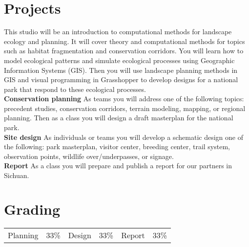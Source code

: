 \documentclass[11pt,article,oneside]{memoir}
\begin{document}
\clearpage

\section{Projects}
This studio will be an introduction to 
computational methods for landscape ecology and planning. 
It will cover theory and computational methods for topics 
such as habitat fragmentation and conservation corridors. 
You will learn how to model ecological patterns 
and simulate ecological processes 
using Geographic Information Systems (GIS). 
Then you will use landscape planning methods in GIS 
and visual programming in Grasshopper 
to develop designs for a national park 
that respond to these ecological processes. \\

\noindent \textbf{Conservation planning}
As teams you will address one of the following topics:
precedent studies, conservation corridors, terrain modeling,
mapping, or regional planning.
Then as a class you will design 
a draft masterplan for the national park.\\

\noindent \textbf{Site design}
As individuals or teams you will develop 
a schematic design one of the following:
park masterplan, visitor center, breeding center, trail system, 
observation points, wildlife over/underpasses, or signage.\\

\noindent \textbf{Report}
As a class you will prepare and publish a report 
for our partners in Sichuan. 

\section{Grading}
%
\begin{table}[H]
\begin{tabular}{l r @{\hskip 2.5cm} l r @{\hskip 2,5cm} l r}
%
Planning & 33\% & Design & 33\% & Report & 33\% \\
%
\end{tabular}
\end{table}

\end{document}
